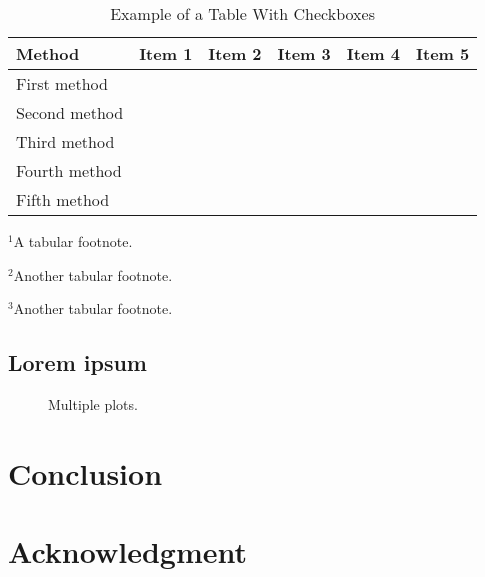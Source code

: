 \documentclass[conference]{IEEEtran}
\begin{document}
\begin{table}[!t]
\centering
\begin{threeparttable}
\renewcommand{\arraystretch}{1.25}
\setlength\tabcolsep{0.24em}
\caption{Example of a Table With Checkboxes}
\label{table_example}
\centering
\begin{tabular}{l|ccccc}
\vspace{-0.3em}
Method & Item 1 & Item 2 & Item 3 & Item 4 & Item 5 \tabularnewline
\hline
First method \cite{Andrews2012,Andrews2010a} & \y[1] & \y & \y[2] & \n & \n \tabularnewline
Second method \cite{Muratore2019} & \n & \y & \y[2] & \y & \n \tabularnewline
Third method \cite{Kwon2018,Maas2003} & \y[3] & \n & \n & \y & \n \tabularnewline
Fourth method \cite{Hameed2018,Hameed2015,Hammler2014} & \y[1] & \y & \y[2] & \y & \y \tabularnewline
Fifth method \cite{Klumperink2017} & \y & \y & \n & \y & \y \tabularnewline
\end{tabular}
\begin{tablenotes}
\scriptsize
  \item $^1$A tabular footnote.
  \item $^2$Another tabular footnote.
  \item $^3$Another tabular footnote.
\end{tablenotes}
\end{threeparttable}
\end{table}


\subsection{Lorem ipsum}
\lipsum[14-15]
\lipsum[16][1-8]

\begin{figure}[!t]
\centering

\caption{Multiple plots.}
\label{fig_multi}
\vspace{-0.4em}
\end{figure}


\section{Conclusion}
\label{section_concl}
\lipsum[20]


\section*{Acknowledgment}
\lipsum[50][1-2]





\end{document}

